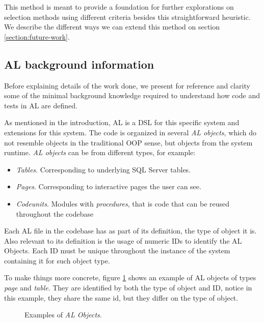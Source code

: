 \documentclass{article}
\begin{document}
This method is meant to provide a foundation for further explorations on selection methods using different criteria besides this straightforward heuristic. We describe the different ways we can extend this method on section \ref{section:future-work}.
\subsection{AL background information}\label{section:al-background-info}
Before explaining details of the work done, we present for reference and clarity some of the minimal background knowledge required to understand how code and tests in AL are defined.

As mentioned in the introduction, AL is a DSL for this specific system and extensions for this system. The code is organized in several \emph{AL objects}, which do not resemble objects in the traditional OOP sense, but objects from the system runtime. \emph{AL objects} can be from different types, for example:
\begin{itemize}
\item \emph{Tables}. Corresponding to underlying SQL Server tables.
\item \emph{Pages}. Corresponding to interactive pages the user can see.
\item \emph{Codeunits}. Modules with \emph{procedures}, that is code that can be reused throughout the codebase
\end{itemize}

Each AL file in the codebase has as part of its definition, the type of object it is. Also relevant to its definition is the usage of numeric IDs to identify the AL Objects. Each ID must be unique throughout the instance of the system containing it for such object type.

To make things more concrete, figure \ref{fig:al-examples} shows an example of AL objects of types \emph{page} and \emph{table}. They are identified by both the type of object and ID, notice in this example, they share the same id, but they differ on the type of object.
\begin{figure}[H]
  \centering
  \qquad
  \caption{Examples of \emph{AL Objects}. }
  \label{fig:al-examples}
\end{figure}
\end{document}
